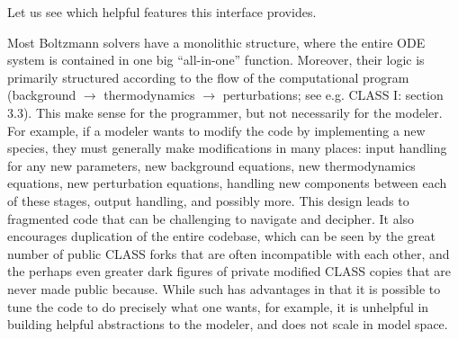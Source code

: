 \documentclass{aa}
\begin{document}
Let us see which helpful features this interface provides.

\iffalse
Reversing the structure of traditional solvers from computational-then-physical to physical-then-computational is a key element in building helpful physical abstractions for the modeler, where everything that is related can be written down in the same place.
The idea is that every component is a logically separated \enquote{chunk} of the entire Einstein-Boltzmann equations contains as many logically separated components as possible with statements that are "locally true" within the component, without knowledge of any other components.
Several such incomplete components (e.g. $\Lambda$ and CDM) are combined into one complete cosmological model (e.g. $\Lambda$CDM) and can be replaced at will.
\fi

\iffalse
Most Boltzmann solvers have a monolithic structure, where the entire ODE system is contained in one big \enquote{all-in-one} function.
Moreover, their logic is primarily structured according to the flow of the computational program (background $\rightarrow$ thermodynamics $\rightarrow$ perturbations; see e.g. CLASS I: section 3.3).
This make sense for the programmer, but not necessarily for the modeler.
For example, if a modeler wants to modify the code by implementing a new species, they must generally make modifications in many places: input handling for any new parameters, new background equations, new thermodynamics equations, new perturbation equations, handling new components between each of these stages, output handling, and possibly more.
This design leads to fragmented code that can be challenging to navigate and decipher.
It also encourages duplication of the entire codebase, which can be seen by the great number of public CLASS forks that are often incompatible with each other, and the perhaps even greater dark figures of private modified CLASS copies that are never made public because.
While such has advantages in that it is possible to tune the code to do precisely what one wants, for example, it is unhelpful in building helpful abstractions to the modeler, and does not scale in model space.
\end{document}
